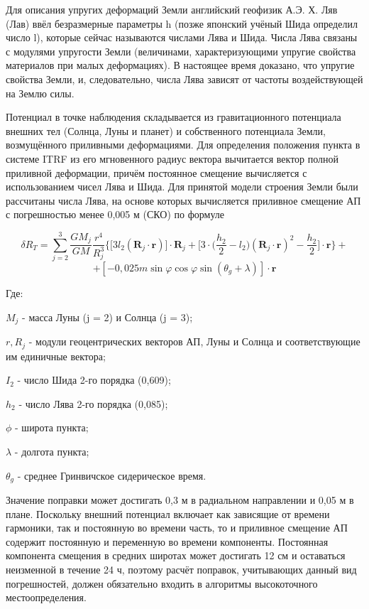 \documentclass[14pt,a4paper,oneside]{extarticle}
\begin{document}
Для описания упругих деформаций Земли английский геофизик А.Э. Х. Ляв (Лав) ввёл безразмерные параметры h (позже японский учёный Шида определил число l), которые сейчас называются числами Лява и Шида. Числа Лява связаны с модулями упругости Земли (величинами, характеризующими упругие свойства материалов при малых деформациях). В настоящее время доказано, что упругие свойства Земли, и, следовательно, числа Лява зависят от частоты воздействующей на Землю силы.

Потенциал в точке наблюдения складывается из гравитационного потенциала внешних тел (Солнца, Луны и планет) и собственного потенциала Земли, возмущённого приливными деформациями. Для определения положения пункта в системе ITRF из его мгновенного радиус вектора вычитается вектор полной приливной деформации, причём постоянное смещение вычисляется с использованием чисел Лява и Шида.
Для принятой модели строения Земли были рассчитаны числа Лява, на основе которых вычисляется приливное смещение АП с погрешностью менее 0,005 м (СКО) по формуле

\[\delta R_T = \sum_{j=2}^{3}\frac{GM_{j}}{GM}\frac{r^{4}}{R_{j}^{3}}\Big\{\Big[3l_{2}(\boldsymbol{R}_{j}\cdot\boldsymbol{r})\Big]\cdot\boldsymbol{R}_{j}+\Big[3\cdot\Big(\frac{h_{2}}{2}-l_{2}\Big)(\boldsymbol{R}_{j}\cdot\boldsymbol{r})^{2}-\frac{h_{2}}{2}\Big]\cdot\boldsymbol{r}\Big\}+\]
\[+\left[-0{,}025m\sin\varphi\cos\varphi\sin(\theta_g+\lambda)\right]\cdot\boldsymbol{r}\]

Где:

$M_j$ - масса Луны (j = 2) и Солнца (j = 3);

$r, R_j$ - модули геоцентрических векторов АП, Луны и Солнца и соответствующие им единичные вектора;

$I_2$ - число Шида 2-го порядка (0,609); 

$h_2$ - число Лява 2-го порядка (0,085); 

$\phi$ - широта пункта;

$\lambda$ - долгота пункта;

$\theta_g$ - среднее Гринвичское сидерическое время.

Значение поправки может достигать 0,3 м в радиальном направлении и 0,05 м в плане. Поскольку внешний потенциал включает как зависящие от времени гармоники, так и постоянную во времени часть, то и приливное смещение АП содержит постоянную и переменную во времени компоненты. Постоянная компонента смещения в средних широтах может достигать 12 см и оставаться неизменной в течение 24 ч, поэтому расчёт поправок, учитывающих данный вид погрешностей, должен обязательно входить в алгоритмы высокоточного местоопределения.
\end{document}

